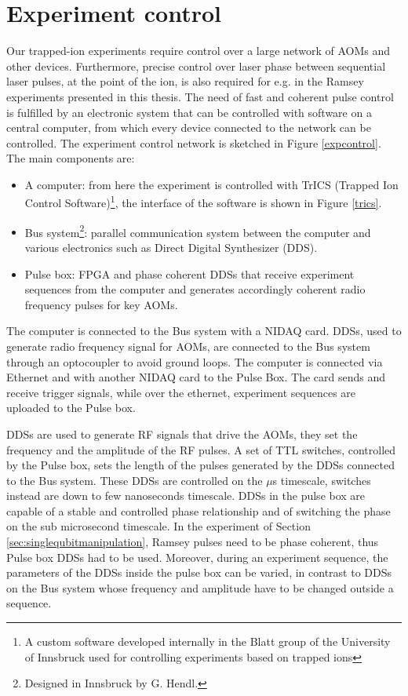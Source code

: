 \section{Experiment control}
\label{sec:expcontrol}
Our trapped-ion experiments require control over a large network of AOMs and other devices. Furthermore, precise control over laser phase between sequential laser pulses, at the point of the ion, is also required for e.g. in the Ramsey experiments presented in this thesis. The need of fast and coherent pulse control is fulfilled by an electronic system that can be controlled with software on a central computer, from which every device connected to the network can be controlled. The experiment control network is sketched in Figure \ref{expcontrol}. The main components are:
\begin{itemize}
\item A computer: from here the experiment is controlled with TrICS (Trapped Ion Control Software)\footnote{A custom software developed internally in the Blatt  group of the University of Innsbruck used for controlling experiments based on trapped ions}, the interface of the software is shown in Figure \ref{trics}.
\item Bus system\footnote{Designed in Innsbruck by G. Hendl.}: parallel communication system between the computer and various electronics such as Direct Digital Synthesizer (DDS).
\item Pulse box: FPGA and phase coherent DDSs that receive experiment sequences from the computer and generates accordingly coherent radio frequency pulses for key AOMs.
\end{itemize}
The computer is connected to the Bus system with a NIDAQ card. DDSs, used to generate radio frequency signal for AOMs, are connected to the Bus system through an optocoupler to avoid ground loops. The computer is connected via Ethernet and with another NIDAQ card to the Pulse Box. The card sends and receive trigger signals, while over the ethernet, experiment sequences are uploaded to the Pulse box.\par
DDSs are used to generate RF signals that drive the AOMs, they set the frequency and the amplitude of the RF pulses. A set of TTL switches, controlled by the Pulse box, sets the length of the pulses generated by the DDSs connected to the Bus system. These DDSs are controlled on the $\mu$s timescale, switches instead are down to few nanoseconds timescale. DDSs in the pulse box are capable of a stable and controlled phase relationship and of switching the phase on the sub microsecond timescale. In the experiment of Section \ref{sec:singlequbitmanipulation}, Ramsey pulses need to be phase coherent, thus Pulse box DDSs had to be used. Moreover, during an experiment sequence, the parameters of the DDSs inside the pulse box can be varied, in contrast to DDSs on the Bus system whose frequency and amplitude have to be changed outside a sequence.\par

